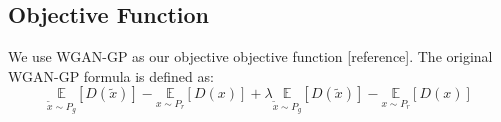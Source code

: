 \subsection{Objective Function}
We use WGAN-GP as our objective objective function [reference]. The original WGAN-GP formula is defined as:
\begin{equation}
\underset{\widetilde{x} \sim P_g}{\mathbb{E}}[D(\widetilde{x})] - \underset{x \sim P_r}{\mathbb{E}}[D(x)] + \lambda  \underset{\widetilde{x} \sim P_g}{\mathbb{E}}[D(\widetilde{x})] - \underset{x \sim P_r}{\mathbb{E}}[D(x)]
\end{equation}